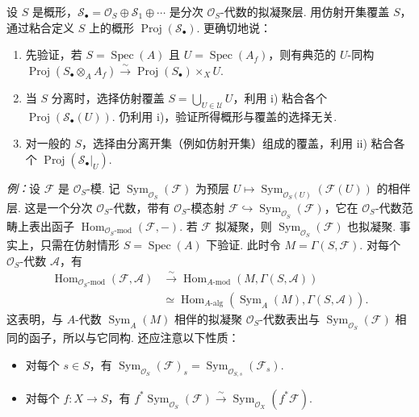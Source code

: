 \begin{numpara}[整体化]\label{item:ag-2-1-4}
设 $S$ 是概形，$\mathcal S_\bullet=\mathcal O_S\oplus\mathcal S_1\oplus\cdots$ 是分次 $\mathcal O_S$-代数的拟凝聚层. 用仿射开集覆盖 $S$，通过粘合定义 $S$ 上的概形 $\operatorname{Proj}(\mathcal S_\bullet)$. 更确切地说：
\begin{enumerate}[label=\roman*)]
\item 先验证，若 $S=\operatorname{Spec}(A)$ 且 $U=\operatorname{Spec}(A_f)$，则有典范的 $U$-同构 $\operatorname{Proj}(S_\bullet\otimes_AA_f)\xrightarrow\sim\operatorname{Proj}(S_\bullet)\times_XU$.
\item 当 $S$ 分离时，选择仿射覆盖 $S=\bigcup_{U\in\mathcal U}U$，利用 i) 粘合各个 $\operatorname{Proj}(\mathcal S_\bullet(U))$. 仍利用 i)，验证所得概形与覆盖的选择无关.
\item 对一般的 $S$，选择由分离开集（例如仿射开集）组成的覆盖，利用 ii) 粘合各个 $\operatorname{Proj}(\mathcal S_\bullet|_U)$.
\end{enumerate}
\emph{例：}设 $\mathcal F$ 是 $\mathcal O_S$-模. 记 $\operatorname{Sym}_{\mathcal O_S}(\mathcal F)$ 为预层 $U\mapsto\operatorname{Sym}_{\mathcal O_S(U)}(\mathcal F(U))$ 的相伴层. 这是一个分次 $\mathcal O_S$-代数，带有 $\mathcal O_S$-模态射 $\mathcal F\hookrightarrow\operatorname{Sym}_{\mathcal O_S}(\mathcal F)$，它在 $\mathcal O_S$-代数范畴上表出函子 $\operatorname{Hom}_{\mathcal O_S\text{-}\mathrm{mod}}(\mathcal F,-)$. 若 $\mathcal F$ 拟凝聚，则 $\operatorname{Sym}_{\mathcal O_S}(\mathcal F)$ 也拟凝聚. 事实上，只需在仿射情形 $S=\operatorname{Spec}(A)$ 下验证. 此时令 $M=\Gamma(S,\mathcal F)$. 对每个 $\mathcal O_S$-代数 $\mathcal A$，有
\begin{align*}
\operatorname{Hom}_{\mathcal O_S\text{-}\mathrm{mod}}(\mathcal F,\mathcal A)
&\xrightarrow\sim\operatorname{Hom}_{A\text{-}\mathrm{mod}}(M,\Gamma(S,\mathcal A))\\
&\simeq\operatorname{Hom}_{A\text{-}\mathrm{alg}}(\operatorname{Sym}_A(M),\Gamma(S,\mathcal A)).
\end{align*}
这表明，与 $A$-代数 $\operatorname{Sym}_A(M)$ 相伴的拟凝聚 $\mathcal O_S$-代数表出与 $\operatorname{Sym}_{\mathcal O_S}(\mathcal F)$ 相同的函子，所以与它同构. 还应注意以下性质：
\begin{itemize}
\item 对每个 $s\in S$，有 $\operatorname{Sym}_{\mathcal O_S}(\mathcal F)_s=\operatorname{Sym}_{\mathcal O_{S,s}}(\mathcal F_s)$.
\item 对每个 $f:X\longrightarrow S$，有 $f^*\operatorname{Sym}_{\mathcal O_S}(\mathcal F)\xrightarrow\sim\operatorname{Sym}_{\mathcal O_X}(f^*\mathcal F)$.

\end{itemize}
\end{numpara}
